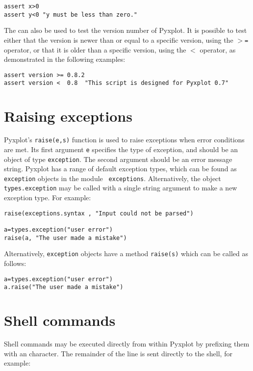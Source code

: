 \begin{verbatim}
assert x>0
assert y<0 "y must be less than zero."
\end{verbatim}

The  can also be used to test the version number of Pyxplot. It
is possible to test either that the version is newer than or equal to a
specific version, using the {\tt $>$=} operator, or that it is older than a
specific version, using the {\tt $<$} operator, as demonstrated in the
following examples:

\begin{verbatim}
assert version >= 0.8.2
assert version <  0.8  "This script is designed for Pyxplot 0.7"
\end{verbatim}


\section{Raising exceptions}

Pyxplot's {\tt raise(e,s)} function is used to raise exceptions when error
conditions are met.  Its first argument {\tt e} specifies the type of
exception, and should be an object of type {\tt exception}. The second argument
should be an error message string.  Pyxplot has a range of default exception
types, which can be found as {\tt exception} objects in the module {\tt
exceptions}. Alternatively, the object {\tt types.exception} may be called with
a single string argument to make a new exception type. For example:

\begin{verbatim}
raise(exceptions.syntax , "Input could not be parsed")

a=types.exception("user error")
raise(a, "The user made a mistake")
\end{verbatim}

Alternatively, {\tt exception} objects have a method {\tt raise(s)} which can be called as follows:

\begin{verbatim}
a=types.exception("user error")
a.raise("The user made a mistake")
\end{verbatim}


\section{Shell commands}

Shell commands may be executed directly from
within Pyxplot by prefixing them with an \indcmdts{!} character. The
remainder of the line is sent directly to the shell, for example:

